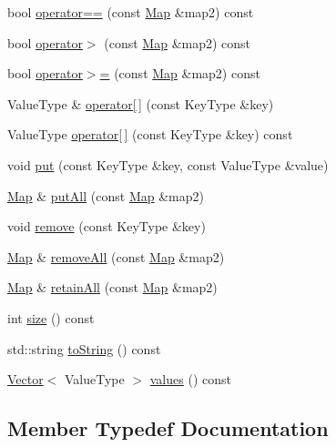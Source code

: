 \begin{DoxyCompactItemize}
bool \mbox{\hyperlink{classMap_a5dda0121a37510aec1dcf9cd53ba21e8}{operator==}} (const \mbox{\hyperlink{classMap}{Map}} \&map2) const
\item 
bool \mbox{\hyperlink{classMap_a991d18b9e2b2e21bd63f6fae462f56f6}{operator$>$}} (const \mbox{\hyperlink{classMap}{Map}} \&map2) const
\item 
bool \mbox{\hyperlink{classMap_a1e36cb0cc936dcb2be3362158099bc8e}{operator$>$=}} (const \mbox{\hyperlink{classMap}{Map}} \&map2) const
\item 
Value\+Type \& \mbox{\hyperlink{classMap_a5bd092d78b82b4818d17917816a59730}{operator\mbox{[}$\,$\mbox{]}}} (const Key\+Type \&key)
\item 
Value\+Type \mbox{\hyperlink{classMap_a9f52896b148cfbbc16e12ad1008971b1}{operator\mbox{[}$\,$\mbox{]}}} (const Key\+Type \&key) const
\item 
void \mbox{\hyperlink{classMap_af0d1d70a37332cb3054fe5b1b170927c}{put}} (const Key\+Type \&key, const Value\+Type \&value)
\item 
\mbox{\hyperlink{classMap}{Map}} \& \mbox{\hyperlink{classMap_aa8f04a9b5782a099d73bb66377d9c110}{put\+All}} (const \mbox{\hyperlink{classMap}{Map}} \&map2)
\item 
void \mbox{\hyperlink{classMap_ac6e7e5198a9f1c8b2cc40fbd1d0eb3b0}{remove}} (const Key\+Type \&key)
\item 
\mbox{\hyperlink{classMap}{Map}} \& \mbox{\hyperlink{classMap_aef8a9fb79f29126a485f697c3069801c}{remove\+All}} (const \mbox{\hyperlink{classMap}{Map}} \&map2)
\item 
\mbox{\hyperlink{classMap}{Map}} \& \mbox{\hyperlink{classMap_abe07b84e7c8050870da86c3d2005f3bb}{retain\+All}} (const \mbox{\hyperlink{classMap}{Map}} \&map2)
\item 
int \mbox{\hyperlink{classMap_af9593d4a5ff4274efaf429cb4f9e57cc}{size}} () const
\item 
std\+::string \mbox{\hyperlink{classMap_a1fe5121d6528fdea3f243321b3fa3a49}{to\+String}} () const
\item 
\mbox{\hyperlink{classVector}{Vector}}$<$ Value\+Type $>$ \mbox{\hyperlink{classMap_a50ccbe4184324f0da975648a12728d20}{values}} () const
\end{DoxyCompactItemize}


\subsection{Member Typedef Documentation}
\mbox{\label{classMap_a04e3b848cce2bbfed5ea818e1b264000}} 
